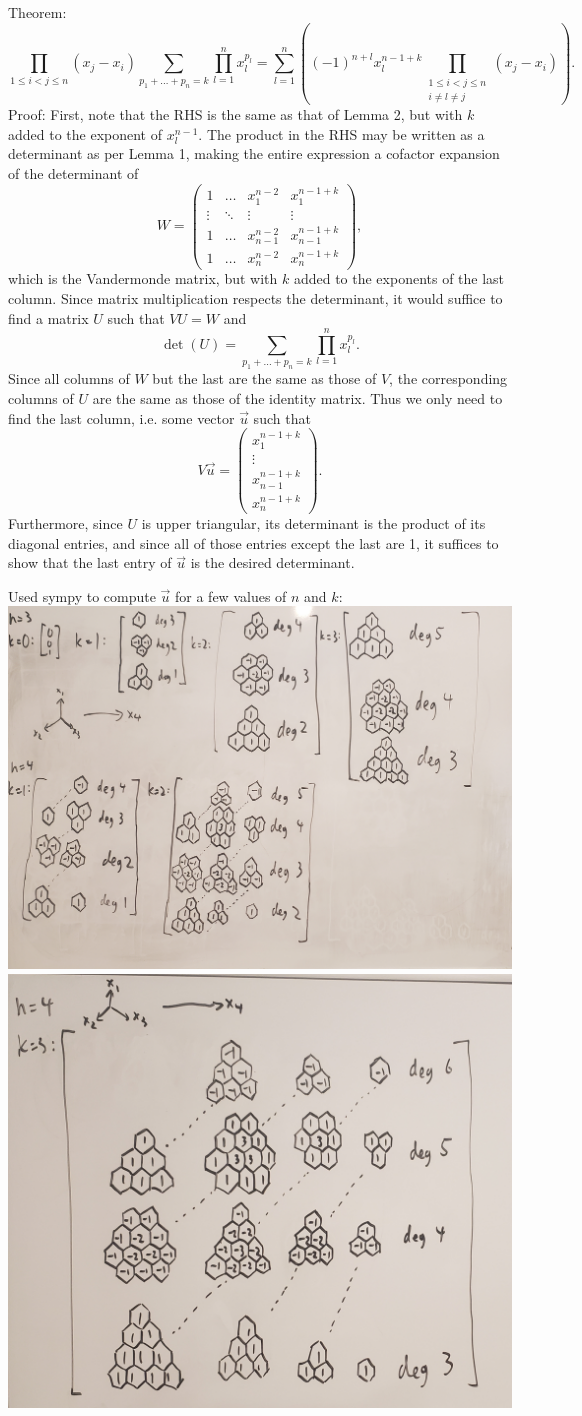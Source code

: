 \documentclass{article}
\begin{document}
Theorem:
\[\prod_{1 \leq i < j \leq n} (x_j-x_i) \sum_{p_1+\ldots+p_n=k} \prod_{l=1}^n x_l^{p_l} = 
\sum_{l=1}^n\left((-1)^{n+l}x_l^{n-1+k}\prod_{\substack{1 \leq i < j \leq n \\ i \neq l \neq j}}(x_j-x_i)\right).
\]
Proof: First, note that the RHS is the same as that of Lemma 2,
but with $k$ added to the exponent of $x_l^{n-1}$.
The product in the RHS may be written as a determinant as per Lemma 1,
making the entire expression a cofactor expansion of the determinant of
\[
W=
\begin{pmatrix}
  1 & \ldots & x_1^{n-2} & x_1^{n-1+k} \\
  \vdots & \ddots & \vdots & \vdots \\
  1 & \ldots & x_{n-1}^{n-2} & x_{n-1}^{n-1+k} \\
  1 & \ldots & x_n^{n-2} & x_n^{n-1+k}
\end{pmatrix},
\]
which is the Vandermonde matrix, but with $k$ added to the exponents of the last column.
Since matrix multiplication respects the determinant,
it would suffice to find a matrix $U$ such that $VU=W$ and
\[\det(U) = \sum_{p_1+\ldots+p_n=k} \prod_{l=1}^n x_l^{p_l}.\]
Since all columns of $W$ but the last are the same as those of $V$,
the corresponding columns of $U$ are the same as those of the identity matrix.
Thus we only need to find the last column,
i.e. some vector $\vec{u}$ such that
\[
V\vec{u} =
\begin{pmatrix}
  x_1^{n-1+k} \\
  \vdots \\
  x_{n-1}^{n-1+k} \\
  x_n^{n-1+k}
\end{pmatrix}.
\]
Furthermore, since $U$ is upper triangular,
its determinant is the product of its diagonal entries,
and since all of those entries except the last are 1,
it suffices to show that the last entry of $\vec{u}$ is the desired determinant.

Used sympy to compute $\vec{u}$ for a few values of $n$ and $k$: \\
\includegraphics[width=0.5\linewidth]{u2.jpg}
\includegraphics[width=0.5\linewidth]{u1.jpg}
\end{document}
